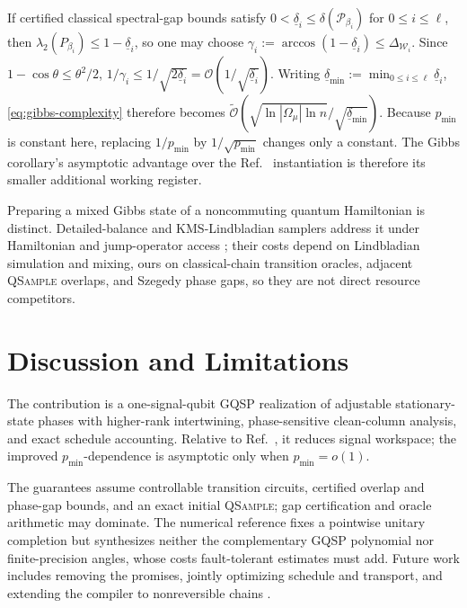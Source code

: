 \documentclass[10pt,conference]{IEEEtran}
\theoremstyle{plain}
\theoremstyle{remark}
\begin{document}
If certified classical spectral-gap bounds satisfy
\(0<\underline\delta_i\leq\delta(\mathcal P_{\beta_i})\) for
\(0\leq i\leq\ell\), then
\(\lambda_2(P_{\beta_i})\leq1-\underline\delta_i\), so one may choose
\(\gamma_i:=\arccos(1-\underline\delta_i)
\leq\Delta_{\mathcal W_i}\).
Since \(1-\cos\theta\leq\theta^2/2\),
\(1/\gamma_i\leq1/\sqrt{2\underline\delta_i}
=\mathcal O(1/\sqrt{\underline\delta_i})\).  Writing
\(\underline\delta_{\min}:=\min_{0\leq i\leq\ell}
\underline\delta_i\), \eqref{eq:gibbs-complexity} therefore becomes
\(\widetilde{\mathcal O}(
\sqrt{\ln|\Omega_\mu|\ln n}/\sqrt{\underline\delta_{\min}})\).
Because \(p_{\min}\) is constant here, replacing
\(1/p_{\min}\) by \(1/\sqrt{p_{\min}}\) changes only a constant.
The Gibbs corollary's asymptotic advantage over the
Ref.~\cite{wocjan_speed-up_2008} instantiation is therefore its
smaller additional working register.

Preparing a mixed Gibbs state of a noncommuting quantum Hamiltonian
is distinct.  Detailed-balance and KMS-Lindbladian samplers address it
under Hamiltonian and jump-operator access
\cite{ChenEtAl2025Thermal,ChenKastoryanoGilyen,DingLiLin2025}; their
costs depend on Lindbladian simulation and mixing, ours on
classical-chain transition oracles, adjacent \textsc{QSample}
overlaps, and Szegedy phase gaps, so they are not direct resource
competitors.


\section{Discussion and Limitations}
\label{sec:discussion}

The contribution is a one-signal-qubit GQSP realization of adjustable
stationary-state phases with higher-rank intertwining,
phase-sensitive clean-column analysis, and exact schedule accounting.
Relative to Ref.~\cite{wocjan_speed-up_2008}, it reduces signal
workspace; the improved \(p_{\min}\)-dependence is asymptotic only
when \(p_{\min}=o(1)\).

The guarantees assume controllable transition circuits, certified
overlap and phase-gap bounds, and an exact initial \textsc{QSample};
gap certification and oracle arithmetic may dominate.  The numerical
reference fixes a pointwise unitary completion but synthesizes neither
the complementary GQSP polynomial nor finite-precision angles, whose
costs fault-tolerant estimates must add.  Future work includes removing
the promises, jointly optimizing schedule and transport, and extending
the compiler to nonreversible chains \cite{Claudon_nonreversible2025}.
\end{document}
